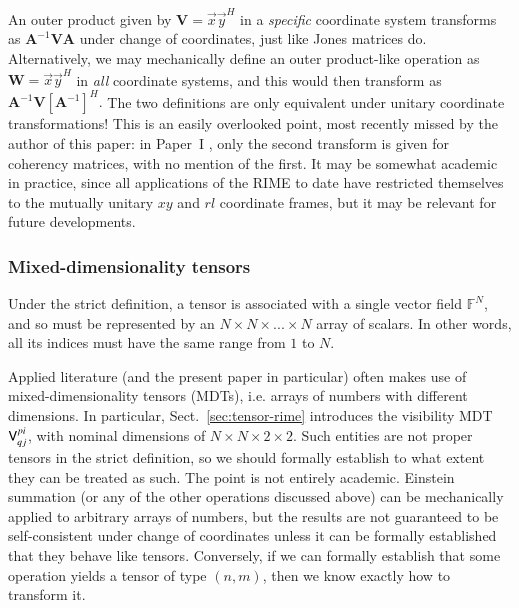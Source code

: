 \documentclass[]{aa}
\newcommand{\herm}{H}
\begin{document}
An outer product given by $\mathbf{V}=\vec x \vec y^\herm$ in a \emph{specific} coordinate system transforms as $\mathbf{A}^{-1}\mathbf{V}\mathbf{A}$ under change of coordinates, just like Jones matrices do. Alternatively, we may mechanically define an outer product-like operation as $\mathbf{W}=\vec x \vec y^\herm$ in \emph{all} coordinate systems, and this would then transform as $\mathbf{A}^{-1}\mathbf{V}[\mathbf{A}^{-1}]^\herm.$ The two definitions are only equivalent under unitary coordinate transformations! This is an easily overlooked point, most recently missed by the author of this paper: in Paper~I 
\citep[Sect.~6.3]{RRIME1}, only the second transform is given for coherency matrices, with no mention of the first. It may be somewhat academic in practice, since all applications of the RIME to date have restricted themselves to the mutually unitary $xy$ and $rl$ coordinate frames, but it may be relevant for future developments.

\subsubsection{Mixed-dimensionality tensors}
\label{sec:tensors-mixed-dim}

Under the strict definition, a tensor is associated with a single vector field $\mathbb{F}^N$, and so must be represented by an $N\times N\times...\times N$ array of scalars. In other words, all its indices must have the same range from $1$ to $N$.

Applied literature (and the present paper in particular) often makes use of mixed-dimensionality tensors (MDTs), i.e. arrays of numbers with different dimensions. In particular, Sect.~\ref{sec:tensor-rime} introduces the visibility MDT $\mathsf{V}^{pi}_{qj}$, with nominal dimensions of $N\times N\times 2\times2$. Such entities are not proper tensors in the strict definition, so we should formally establish to what extent they can be treated as such. The point is not entirely academic. Einstein summation (or any of the other operations discussed above) can be mechanically 
applied to arbitrary arrays of numbers, but the results are not guaranteed to be self-consistent under change of coordinates unless it can be formally established that they behave like tensors. Conversely, if we can formally establish that some operation yields a tensor of type $(n,m)$, then we know exactly how to transform it.
\end{document}
